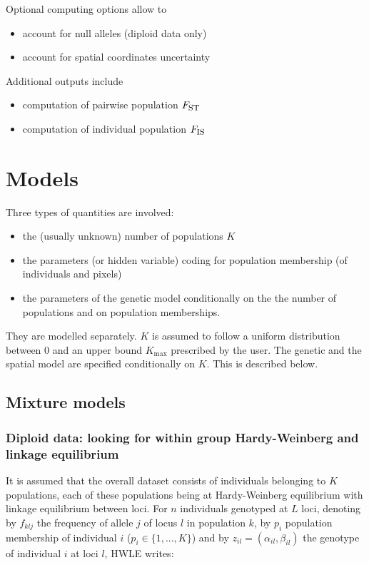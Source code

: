 \documentclass[a4paper,10pt]{article}
\newcommand{\Fst}{F_{\mbox{\footnotesize ST}}}
\newcommand{\Fis}{F_{\mbox{\footnotesize IS}}}
\begin{document}
Optional computing options allow to 
\begin{itemize}
\item account for null alleles (diploid data only)
\item account for spatial coordinates uncertainty
\end{itemize}

Additional outputs include
\begin{itemize}
\item computation of pairwise population $\Fst$
\item computation of individual population $\Fis$
\end{itemize}



\section{Models}\label{sec:models}

Three types of quantities are involved:
\begin{itemize}
\item  the (usually unknown) number of populations $K$ 
\item the parameters (or hidden variable) coding for population membership (of individuals and pixels)
\item the parameters of the genetic model conditionally on the the number of populations and on 
population memberships.
 \end{itemize}

They are modelled separately. $K$ is assumed to follow a uniform distribution between 0 and an upper bound $K_{\max}$ 
prescribed by the user. The genetic and the spatial model are specified conditionally on $K$. 
This is described below. 



\subsection{Mixture models}\label{sec:mixture}
\subsubsection{Diploid data: looking for within group Hardy-Weinberg and linkage equilibrium}

It is assumed that the overall dataset consists of individuals belonging to $K$ populations, each of these populations being 
at Hardy-Weinberg equilibrium with linkage equilibrium between loci. For $n$ individuals genotyped at $L$ loci, 
denoting by $f_{klj}$ the frequency of allele 
$j$ of locus $l$ in population $k$, by $p_i$ population membership of individual $i$ ($p_i  \in \{1,...,K\}$) and by 
$z_{il}=(\alpha_{il},\beta_{il})$ the genotype of individual $i$ at loci $l$, HWLE writes: 
\end{document}
